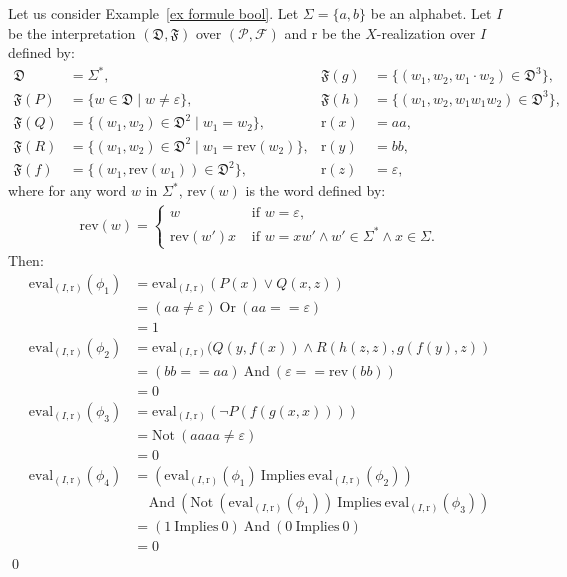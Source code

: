 \documentclass[a4paper]{llncs}
\begin{document}
  
  \begin{example}\label{ex inter real}
    Let us consider Example~\ref{ex formule bool}. Let $\Sigma=\{a,b\}$ be an alphabet. Let $I$ be the interpretation $(\mathfrak{D},\mathfrak{F})$ over $(\mathcal{P},\mathcal{F})$ and $\mathrm{r}$ be the $X$-realization over $I$ defined by:
  \begin{align*}
          \mathfrak{D} & =\Sigma^*, & \mathfrak{F}(g) & =\{(w_1,w_2,w_1\cdot w_2)\in \mathfrak{D}^3\},\\
          \mathfrak{F}(P) & =\{w\in \mathfrak{D}\mid w\neq\varepsilon\}, & \mathfrak{F}(h) & =\{(w_1,w_2,w_1w_1w_2)\in \mathfrak{D}^3\},\\
          \mathfrak{F}(Q) & =\{(w_1,w_2)\in \mathfrak{D}^2\mid w_1=w_2\},&\mathrm{r}(x) & =aa,\\
          \mathfrak{F}(R) & =\{(w_1,w_2)\in \mathfrak{D}^2\mid w_1=\mathrm{rev}(w_2)\},&\mathrm{r}(y) & =bb,\\
          \mathfrak{F}(f) & =\{(w_1,\mathrm{rev}(w_1))\in \mathfrak{D}^2\},&\mathrm{r}(z) & =\varepsilon,
  \end{align*}
  where for any word $w$ in $\Sigma^*$, $\mathrm{rev}(w)$ is the word defined by:
  \begin{align*}
      \mathrm{rev}(w)=
        \begin{cases}
            w & \text{ if } w=\varepsilon,\\
            \mathrm{rev}(w')x & \text{ if }w=xw'\wedge w'\in\Sigma^*\wedge x\in\Sigma.
          \end{cases}
  \end{align*}
  Then:    
    \begin{align*}
      \mathrm{eval}_{(I,\mathrm{r})}(\phi_1) & =\mathrm{eval}_{(I,\mathrm{r})}(P(x) \vee Q(x,z))\\
      & =(aa\neq\varepsilon)\ \mathrm{Or}\ (aa==\varepsilon)\\
      & =1\\
      \mathrm{eval}_{(I,\mathrm{r})}(\phi_2) & =\mathrm{eval}_{(I,\mathrm{r})}(Q(y,f(x)) \wedge R(h(z,z),g(f(y),z))\\
      & =(bb==aa)\ \mathrm{And}\ (\varepsilon == \mathrm{rev}(bb))\\
      & =0\\      
      \mathrm{eval}_{(I,\mathrm{r})}(\phi_3) & =\mathrm{eval}_{(I,\mathrm{r})}(\neg P(f(g(x,x))))\\
      & =\mathrm{Not}\ (aaaa\neq\varepsilon)\\
      & =0\\      
      \mathrm{eval}_{(I,\mathrm{r})}(\phi_4) & =(\mathrm{eval}_{(I,\mathrm{r})}(\phi_1)\ \mathrm{Implies}\ \mathrm{eval}_{(I,\mathrm{r})}(\phi_2))\\
      & \ \ \ \ \ \mathrm{And}\ (\mathrm{Not}\ (\mathrm{eval}_{(I,\mathrm{r})}(\phi_1))\ \mathrm{Implies}\ \mathrm{eval}_{(I,\mathrm{r})}(\phi_3))\\
      & =(1\ \mathrm{Implies}\  0)\ \mathrm{And}\ (0\ \mathrm{Implies}\ 0)\\
      & =0
    \end{align*}
    \qed       
  \end{example}
  
\end{document}
